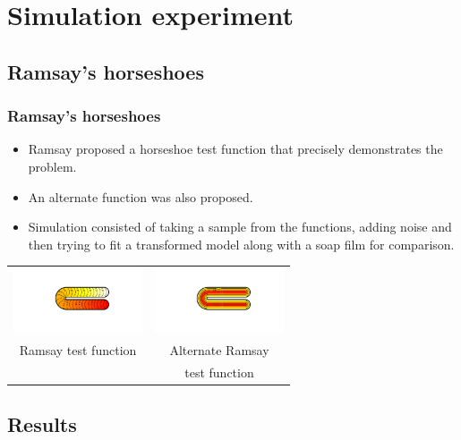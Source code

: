 \documentclass[ignorenonframetext]{beamer} %
\newcommand{\bc}{\begin{center}}
\newcommand{\ec}{\end{center}}
\newcommand{\bi}{\begin{itemize}}
\newcommand{\ei}{\end{itemize}}
\begin{document}
\section{Simulation experiment}

\subsection{Ramsay's horseshoes}

\begin{frame}
	\frametitle{Ramsay's horseshoes}
       \bi
         \item Ramsay proposed a horseshoe test function that precisely demonstrates the problem. 
         \item An alternate function was also proposed.
         \item Simulation consisted of taking a sample from the functions, adding noise and then trying to fit a transformed model along with a soap film for comparison.
       \ei
       \bc\begin{tabular}{@{}cc}
          \includegraphics[width=1.5in, trim=1in 1in 1in 1in]{figs/ramsayhorseshoe} & \includegraphics[width=1.5in, trim=1in 1in 1in 1in]{figs/altramsayhorseshoe}\\
          Ramsay test function & Alternate Ramsay\\
           & test function\\
       \end{tabular}\ec

\end{frame}

\subsection{Results}
\end{document}
